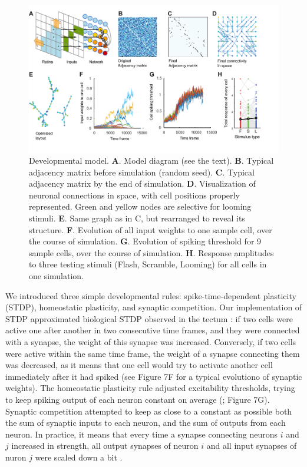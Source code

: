 \documentclass{article}
\begin{document}
\begin{figure}[!t]
\includegraphics[width=\linewidth]{fig7.pdf}
\caption{
Developmental model. \textbf{A}. Model diagram (see the text). \textbf{B}. Typical adjacency matrix before simulation (random seed). \textbf{C}. Typical adjacency matrix by the end of simulation. \textbf{D}. Visualization of neuronal connections in space, with cell positions properly represented. Green and yellow nodes are selective for looming stimuli. \textbf{E}. Same graph as in C, but rearranged to reveal its structure. \textbf{F}. Evolution of all input weights to one sample cell, over the course of simulation. \textbf{G}. Evolution of spiking threshold for 9 sample cells, over the course of simulation. \textbf{H}. Response amplitudes to three testing stimuli (Flash, Scramble, Looming) for all cells in one simulation. }
\end{figure}

We introduced three simple developmental rules: spike-time-dependent plasticity (STDP), homeostatic plasticity, and synaptic competition. Our implementation of STDP approximated biological STDP observed in the tectum \citep{zhang1998stdp, mu2006stdp}: if two cells were active one after another in two consecutive time frames, and they were connected with a synapse, the weight of this synapse was increased. Conversely, if two cells were active within the same time frame, the weight of a synapse connecting them was decreased, as it means that one cell would try to activate another cell immediately after it had spiked (see Figure 7F for a typical evolutiono of synaptic weights). The homeostatic plasticity rule adjusted excitability thresholds, trying to keep spiking output of each neuron constant on average (\citealt{pratt2007intrinsic, turrigiano2011}; Figure 7G). Synaptic competition attempted to keep as close to a constant as possible both the sum of synaptic inputs to each neuron, and the sum of outputs from each neuron. In practice, it means that every time a synapse connecting neurons $i$ and $j$ increased in strength, all output synapses of neuron $i$ and all input synapses of nuron $j$ were scaled down a bit \citep{cohen2002synreview, munz2014hebbian, hamodi2016nmda}.
\end{document}
